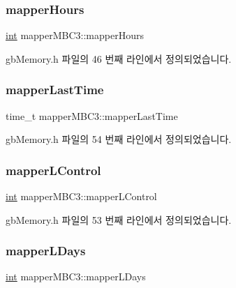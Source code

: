 \subsubsection{\texorpdfstring{mapper\+Hours}{mapperHours}}
{\footnotesize\ttfamily \mbox{\hyperlink{_util_8cpp_a0ef32aa8672df19503a49fab2d0c8071}{int}} mapper\+M\+B\+C3\+::mapper\+Hours}



gb\+Memory.\+h 파일의 46 번째 라인에서 정의되었습니다.

\mbox{\label{structmapper_m_b_c3_a0af0b1504e0506e54dafd63f19bfedf5}} 
\subsubsection{\texorpdfstring{mapper\+Last\+Time}{mapperLastTime}}
{\footnotesize\ttfamily time\+\_\+t mapper\+M\+B\+C3\+::mapper\+Last\+Time}



gb\+Memory.\+h 파일의 54 번째 라인에서 정의되었습니다.

\mbox{\label{structmapper_m_b_c3_aaa650a87f08367af631a599d2ff39655}} 
\subsubsection{\texorpdfstring{mapper\+L\+Control}{mapperLControl}}
{\footnotesize\ttfamily \mbox{\hyperlink{_util_8cpp_a0ef32aa8672df19503a49fab2d0c8071}{int}} mapper\+M\+B\+C3\+::mapper\+L\+Control}



gb\+Memory.\+h 파일의 53 번째 라인에서 정의되었습니다.

\mbox{\label{structmapper_m_b_c3_a064bb5d4f64ac74e8ce84a19f4ceceeb}} 
\subsubsection{\texorpdfstring{mapper\+L\+Days}{mapperLDays}}
{\footnotesize\ttfamily \mbox{\hyperlink{_util_8cpp_a0ef32aa8672df19503a49fab2d0c8071}{int}} mapper\+M\+B\+C3\+::mapper\+L\+Days}



